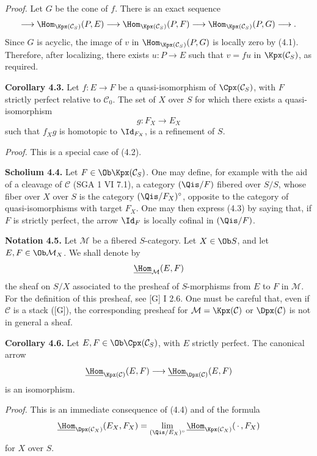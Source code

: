 \emph{Proof.} Let \(G\) be the cone of \(f\). There is an exact sequence
\[
  \longrightarrow \Hom_{\Kpx(\mathcal C_S)}(P,E)
  \longrightarrow \Hom_{\Kpx(\mathcal C_S)}(P,F)
  \longrightarrow \Hom_{\Kpx(\mathcal C_S)}(P,G)
  \longrightarrow .
\]
Since \(G\) is acyclic, the image of \(v\) in \(\Hom_{\Kpx(\mathcal C_S)}(P,G)\) is locally zero by (4.1). Therefore, after localizing, there exists \(u:P\to E\) such that \(v=fu\) in \(\Kpx(\mathcal C_S)\), as required.

\textbf{Corollary 4.3.} Let \(f:E\to F\) be a quasi-isomorphism of \(\Cpx(\mathcal C_S)\), with \(F\) strictly perfect relative to \(\mathcal C_0\). The set of \(X\) over \(S\) for which there exists a quasi-isomorphism
\[
  g:F_X\longrightarrow E_X
\]
such that \(f_Xg\) is homotopic to \(\Id_{F_X}\), is a refinement of \(S\).

\emph{Proof.} This is a special case of (4.2).

\textbf{Scholium 4.4.} Let \(F\in\Ob\Kpx(\mathcal C_S)\). One may define, for example with the aid of a cleavage of \(\mathcal C\) (SGA 1 VI 7.1), a category \((\Qis/F)\) fibered over \(S/S\), whose fiber over \(X\) over \(S\) is the category \((\Qis/F_X)^\circ\), opposite to the category of quasi-isomorphisms with target \(F_X\). One may then express (4.3) by saying that, if \(F\) is strictly perfect, the arrow \(\Id_F\) is locally cofinal in \((\Qis/F)\).

\textbf{Notation 4.5.} Let \(\mathcal M\) be a fibered \(S\)-category. Let \(X\in\Ob S\), and let \(E,F\in\Ob\mathcal M_X\). We shall denote by
\[
  \underline{\Hom}_{\mathcal M}(E,F)
\]
the sheaf on \(S/X\) associated to the presheaf of \(S\)-morphisms from \(E\) to \(F\) in \(\mathcal M\). For the definition of this presheaf, see [G] I 2.6. One must be careful that, even if \(\mathcal C\) is a stack ([G]), the corresponding presheaf for \(\mathcal M=\Kpx(\mathcal C)\) or \(\Dpx(\mathcal C)\) is not in general a sheaf.

\textbf{Corollary 4.6.} Let \(E,F\in\Ob\Cpx(\mathcal C_S)\), with \(E\) strictly perfect. The canonical arrow
\[
  \underline{\Hom}_{\Kpx(\mathcal C)}(E,F)
  \longrightarrow
  \underline{\Hom}_{\Dpx(\mathcal C)}(E,F)
\]
is an isomorphism.

\emph{Proof.} This is an immediate consequence of (4.4) and of the formula
\[
  \underline{\Hom}_{\Dpx(\mathcal C_X)}(E_X,F_X)
  = \lim_{(\Qis/E_X)^\circ}\underline{\Hom}_{\Kpx(\mathcal C_X)}(\,\cdot\,,F_X)
\]
for \(X\) over \(S\).

